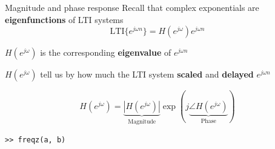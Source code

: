 \documentclass[10pt]{beamer}
\begin{document}
\begin{frame}{Magnitude and phase response}
Recall that complex exponentials are \textbf{eigenfunctions} of LTI systems
\begin{equation*}
\mathrm{LTI}\{e^{j\omega n}\} = H(e^{j\omega})e^{j\omega n}
\end{equation*}

$H(e^{j\omega})$ is the corresponding \textbf{eigenvalue} of $e^{j\omega n}$

$H(e^{j\omega})$ tell us by how much the LTI system \textbf{scaled} and \textbf{delayed} $e^{j\omega n}$

\begin{equation*}
H(e^{j\omega}) = \underbrace{|H(e^{j\omega})|}_{\text{Magnitude}}\exp(j\underbrace{\angle H(e^{j\omega})}_{\text{Phase}})
\end{equation*}

\pause
\texttt{>> freqz(a, b)}
\vspace{-0.25cm}
\begin{center}
\end{center}
\end{frame}
\end{document}

